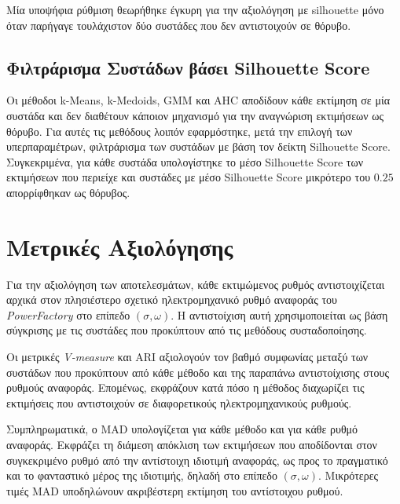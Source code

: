 Μία υποψήφια ρύθμιση θεωρήθηκε έγκυρη για την αξιολόγηση με silhouette
μόνο όταν παρήγαγε τουλάχιστον δύο συστάδες που δεν αντιστοιχούν σε θόρυβο.

\subsection{Φιλτράρισμα Συστάδων βάσει Silhouette Score}
\label{amb:silhouette-filtering}
Οι μέθοδοι k-Means, k-Medoids, GMM και AHC αποδίδουν κάθε εκτίμηση σε μία συστάδα και δεν διαθέτουν κάποιον μηχανισμό για την αναγνώριση εκτιμήσεων ως θόρυβο. Για αυτές τις μεθόδους λοιπόν εφαρμόστηκε, μετά την επιλογή των υπερπαραμέτρων, φιλτράρισμα των συστάδων με βάση τον δείκτη Silhouette Score. Συγκεκριμένα, για κάθε συστάδα υπολογίστηκε το μέσο Silhouette Score των εκτιμήσεων που περιείχε και συστάδες με μέσο Silhouette Score μικρότερο του $0.25$ απορρίφθηκαν ως θόρυβος.

\section{Μετρικές Αξιολόγησης}

Για την αξιολόγηση των αποτελεσμάτων, κάθε εκτιμώμενος ρυθμός αντιστοιχίζεται αρχικά στον πλησιέστερο σχετικό ηλεκτρομηχανικό ρυθμό αναφοράς του \textenglish{\textit{PowerFactory}} στο επίπεδο $(\sigma,\omega)$. Η αντιστοίχιση αυτή χρησιμοποιείται ως βάση σύγκρισης με τις συστάδες που προκύπτουν από τις μεθόδους συσταδοποίησης.

Οι μετρικές \textenglish{\textit{V-measure}} και ARI αξιολογούν τον βαθμό συμφωνίας μεταξύ
των συστάδων που προκύπτουν από κάθε μέθοδο και της παραπάνω αντιστοίχισης
στους ρυθμούς αναφοράς. Επομένως, εκφράζουν κατά πόσο η μέθοδος διαχωρίζει
τις εκτιμήσεις που αντιστοιχούν σε διαφορετικούς ηλεκτρομηχανικούς ρυθμούς.

Συμπληρωματικά, ο MAD υπολογίζεται για κάθε μέθοδο και για κάθε ρυθμό
αναφοράς. Εκφράζει τη διάμεση απόκλιση των εκτιμήσεων που αποδίδονται στον
συγκεκριμένο ρυθμό από την αντίστοιχη ιδιοτιμή αναφοράς, ως προς το
πραγματικό και το φανταστικό μέρος της ιδιοτιμής, δηλαδή στο επίπεδο
$(\sigma,\omega)$. Μικρότερες τιμές MAD υποδηλώνουν ακριβέστερη εκτίμηση του
αντίστοιχου ρυθμού.
